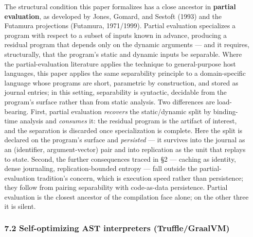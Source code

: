 \documentclass[
]{article}
\begin{document}
The structural condition this paper formalizes has a close ancestor in
\textbf{partial evaluation}, as developed by Jones, Gomard, and Sestoft
(1993) and the Futamura projections (Futamura, 1971/1999). Partial
evaluation specializes a program with respect to a subset of inputs
known in advance, producing a residual program that depends only on the
dynamic arguments --- and it requires, structurally, that the program's
static and dynamic inputs be separable. Where the partial-evaluation
literature applies the technique to general-purpose host languages, this
paper applies the same separability principle to a domain-specific
language whose programs are short, parametric by construction, and
stored as journal entries; in this setting, separability is syntactic,
decidable from the program's surface rather than from static analysis.
Two differences are load-bearing. First, partial evaluation
\emph{recovers} the static/dynamic split by binding-time analysis and
\emph{consumes} it: the residual program is the artifact of interest,
and the separation is discarded once specialization is complete. Here
the split is declared on the program's surface and \emph{persisted} ---
it survives into the journal as an (identifier, argument-vector) pair
and into replication as the unit that replays to state. Second, the
further consequences traced in §2 --- caching as identity, dense
journaling, replication-bounded entropy --- fall outside the
partial-evaluation tradition's concern, which is execution speed rather
than persistence; they follow from pairing separability with
code-as-data persistence. Partial evaluation is the closest ancestor of
the compilation face alone; on the other three it is silent.

\subsubsection{7.2 Self-optimizing AST interpreters
(Truffle/GraalVM)}\label{self-optimizing-ast-interpreters-trufflegraalvm}
\end{document}
